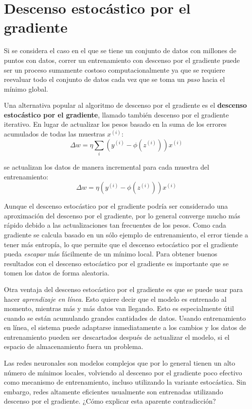 \section{Descenso estocástico por el gradiente}
Si se considera el caso en el que se tiene un conjunto de datos con
millones de puntos con datos, correr un entrenamiento con descenso por
el gradiente puede ser un proceso sumamente costoso computacionalmente
ya que se requiere reevaluar todo el conjunto de datos cada vez que se
toma un \textit{paso} hacia el mínimo global.

Una alternativa popular al algoritmo de descenso por el gradiente es el
\textbf{descenso estocástico por el gradiente}, llamado también
descenso por el gradiente iterativo. En lugar de actualizar los pesos
basado en la suma de los errores acumulados de todas las muestras
$x^{(i)}$:
\begin{equation}
  \Delta w = \eta \sum_i(y^{(i)} - \phi(z^{(i)}))x^{(i)}
\end{equation}

se actualizan los datos de manera incremental para cada muestra del
entrenamiento:
\begin{equation}
  \Delta w = \eta(y^{(i)} - \phi(z^{(i)}))x^{(i)}
\end{equation}

Aunque el descenso estocástico por el gradiente podría ser considerado
una aproximación del descenso por el gradiente, por lo general
converge mucho más rápido debido a las actualizaciones tan frecuentes
de los pesos. Como cada gradiente se calcula basado en un sólo ejemplo
de entrenamiento, el error tiende a tener más entropía, lo que
permite que el descenso estocástico por el gradiente
pueda \textit{escapar} más fácilmente de un mínimo local. Para obtener
buenos resultados con el descenso estocástico por el gradiente es
importante que se tomen los datos de forma aleatoria.

Otra ventaja del descenso estocástico por el gradiente es que se puede
usar para hacer \textit{aprendizaje en línea}. Esto quiere decir que
el modelo es entrenado al momento, mientras más y más datos van
llegando. Esto es especialmente útil cuando se están acumulando
grandes cantidades de datos.  Usando entrenamiento en línea, el
sistema puede adaptarse inmediatamente a los cambios y los datos de
entrenamiento pueden ser descartados después de actualizar el modelo,
si el espacio de almacenamiento fuera un problema.

Las redes neuronales son modelos complejos que por lo general tienen
un alto número de mínimos locales, volviendo al descenso por el
gradiente poco efectivo como mecanismo de entrenamiento, incluso
utilizando la variante estocástica. Sin embargo, redes altamente
eficientes usualmente son entrenadas utilizando descenso por el
gradiente. ¿Cómo explicar esta aparente contradicción?

